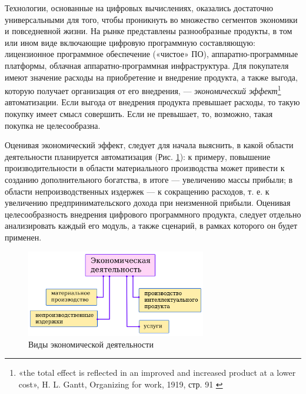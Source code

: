 \documentclass{article}
\begin{document}
Технологии, основанные на цифровых вычислениях, оказались достаточно универсальными для того, чтобы проникнуть во множество сегментов экономики и повседневной жизни. На рынке представлены разнообразные продукты, в том или ином виде включающие цифровую программную составляющую: лицензионное программное обеспечение («чистое» ПО), аппаратно-программные платформы, облачная аппаратно-программная инфраструктура. Для покупателя имеют значение расходы на приобретение и внедрение продукта, а также выгода, которую получает организация от его внедрения, — \textit{экономический эффект}\footnote{«the total effect is reflected in an improved and increased product at a lower cost», H. L. Gantt, Organizing for work, 1919, стр. 91 \cite{ecoEffectOrganizingForWork}} автоматизации. Если выгода от внедрения продукта превышает расходы, то такую покупку имеет смысл совершить. Если не превышает, то, возможно, такая покупка не целесообразна.

Оценивая экономический эффект, следует для начала выяснить, в какой области деятельности планируется автоматизация (Рис. \ref{fig:eco_acts}): к примеру, повышение производительности в области материального производства может привести к созданию дополнительного богатства, в итоге — увеличению массы прибыли; в области непроизводственных издержек — к сокращению расходов, т. е. к увеличению предпринимательского дохода при неизменной прибыли. Оценивая целесообразность внедрения цифрового программного продукта, следует отдельно анализировать каждый его модуль, а также сценарий, в рамках которого он будет применен.

\begin{figure}[h]
    \centering
    \includegraphics[width=0.70\textwidth]{eco-acts}
    \caption{Виды экономической деятельности}
    \label{fig:eco_acts}
\end{figure}

\end{document}
